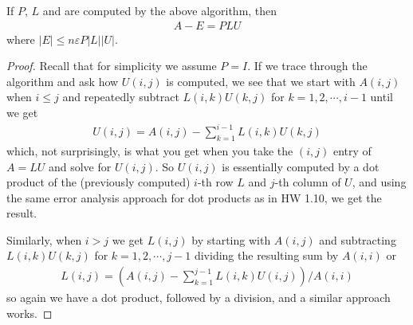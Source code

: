 \documentclass[11pt]{article}
\numberwithin{equation}{section}
\begin{document}
\begin{theorem}
    If $P$, $L$ and are computed by the above algorithm, then \begin{align*}
        A - E = PLU
    \end{align*}
    where $|E| \leq n \varepsilon P|L||U|$.
    \begin{proof}
        Recall that for simplicity we assume $P=I$. If we trace through the algorithm and ask how $U(i,j)$ is computed, 
        we see that we start with $A(i,j)$ when $i \leq j$ and repeatedly subtract $L(i,k)U(k,j)$ for $k=1,2,\cdots, i-1$ until we get \begin{align*}
            U(i,j) = A(i,j) - \sum_{k=1}^{i-1} L(i,k)U(k,j)
        \end{align*}
        which, not surprisingly, is what you get when you take the $(i,j)$ entry of $A = LU$ and solve for $U(i,j)$. So $U(i,j)$ is essentially computed by
        a dot product of the (previously computed) $i$-th row $L$ and $j$-th column of $U$, and using the same error analysis approach for dot products as
        in HW 1.10, we get the result.

        Similarly, when $i > j$ we get $L(i,j)$ by starting with $A(i,j)$ and subtracting $L(i,k)U(k,j)$ for $k=1,2,\cdots, j-1$ dividing the resulting sum by $A(i,i)$ or
        \begin{align*}
            L(i,j) = (A(i,j) - \sum_{k=1}^{j-1} L(i,k)U(i,j))/A(i,i)
        \end{align*}
        so again we have a dot product, followed by a division, and a similar approach works.
    \end{proof}
\end{theorem}
\end{document}
